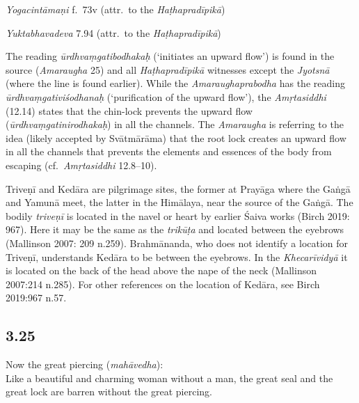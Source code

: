 \begin{ekdosis}
\begin{testimonia}[hp03_024]
\emph{Yogacintāmaṇi} f.~73v (attr.~to the \emph{Haṭhapradīpikā})
\begin{versinnote}
\end{versinnote}

\emph{Yuktabhavadeva} 7.94 (attr.~to the \emph{Haṭhapradīpikā})
\begin{versinnote}
\end{versinnote}
\end{testimonia}

\begin{philcomm}[hp03_024]
The reading \emph{ūrdhvaṃgatibodhakaḥ} (`initiates an upward flow') is found in the source (\emph{Amaraugha} 25) and all \emph{Haṭhapradīpikā} witnesses except the \emph{Jyotsnā} (where the line is found earlier). While the \emph{Amaraughaprabodha} has the reading \emph{ūrdhvaṃgativiśodhanaḥ} (`purification of the upward flow'), the \emph{Amṛtasiddhi} (12.14) states that the chin-lock prevents the upward flow (\emph{ūrdhvaṃgatinirodhakaḥ}) in all the channels. The \textit{Amaraugha} is referring to the idea (likely accepted by Svātmārāma) that the root lock creates an upward flow in all the channels that prevents the elements and essences of the body from escaping (cf.~\emph{Amṛtasiddhi} 12.8–10).

Triveṇī and Kedāra are pilgrimage sites, the former at Prayāga where the Gaṅgā and Yamunā meet, the latter in the Himālaya, near the source of the Gaṅgā. The bodily \emph{triveṇī} is located in the navel or heart by earlier Śaiva works (Birch 2019: 967). Here it may be the same as the \emph{trikūṭa} and located between the eyebrows (Mallinson 2007: 209 n.259). Brahmānanda, who does not identify a location for Triveṇī, understands Kedāra to be between the eyebrows. In the \emph{Khecarīvidyā} it is located on the back of the head above the nape of the neck (Mallinson 2007:214 n.285). For other references on the location of Kedāra, see Birch 2019:967 n.57.
\end{philcomm}

\subsection*{3.25}
\begin{translation}[hp03_025]
Now the great piercing (\emph{mahāvedha}):\\
Like a beautiful and charming woman without a man, the great seal and the great lock are barren without the great piercing.\\
\end{translation}


\end{ekdosis}
